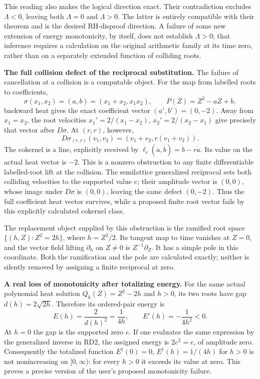 \documentclass[11pt,a4paper]{article}
\theoremstyle{definition}\newtheorem{definition}[theorem]{Definition}
\begin{document}
This reading also makes the logical direction exact. Their contradiction
excludes $\Lambda<0$, leaving both $\Lambda=0$ and $\Lambda>0$.
The latter is entirely compatible with their theorem and is the desired
RH-disproof direction. A failure of some new extension of energy
monotonicity, by itself, does not establish $\Lambda>0$; that inference
requires a calculation on the original arithmetic family at its time
zero, rather than on a separately extended function of colliding roots.

\RD\textbf{The full collision defect of the reciprocal substitution.}
The failure of cancellation at a collision is a computable object.
For the map from labelled roots to coefficients,
\[
 \sigma(x_1,x_2)=(a,b)=(x_1+x_2,x_1x_2),\qquad
 P(Z)=Z^2-aZ+b,
\]
backward heat gives the exact coefficient vector $(a',b')=(0,-2)$.
Away from $x_1=x_2$, the root velocities
$x_1'=2/(x_1-x_2)$, $x_2'=2/(x_2-x_1)$ give precisely that
vector after $D\sigma$.
At $(r,r)$, however,
\[
 D\sigma_{(r,r)}(v_1,v_2)=(v_1+v_2,r(v_1+v_2)).
\]
The cokernel is a line, explicitly received by
$\ell_r(\dot a,\dot b)=\dot b-r\dot a$. Its value on the actual
heat vector is $-2$. This is a nonzero obstruction to any finite
differentiable labelled-root lift at the collision.
The semilattice generalized reciprocal sets both colliding velocities
to the supported value $e$; their amplitude vector is $(0,0)$, whose
image under $D\sigma$ is $(0,0)$, leaving the same defect $(0,-2)$.
Thus the full coefficient heat vector survives, while a proposed finite
root vector fails by this explicitly calculated cokernel class.

The replacement object supplied by this obstruction is the ramified
root space $\{(h,Z):Z^2=2h\}$, where $h=Z^2/2$. Its tangent map to
time vanishes at $Z=0$, and the vector field lifting $\partial_h$ on
$Z\ne0$ is $Z^{-1}\partial_Z$. It has a simple pole in this
coordinate. Both the ramification and the pole are calculated exactly;
neither is silently removed by assigning a finite reciprocal at zero.

\RD\textbf{A real loss of monotonicity after totalizing energy.}
For the same actual polynomial heat solution $Q_h(Z)=Z^2-2h$ and
$h>0$, its two roots have gap $d(h)=2\sqrt{2h}$. Therefore its
ordered-pair energy is
\[
 E(h)=\frac2{d(h)^2}=\frac1{4h},\qquad E'(h)=-\frac1{4h^2}<0.
\]
At $h=0$ the gap is the supported zero $e$. If one evaluates the
same expression by the generalized inverse in RD2, the assigned
energy is $2e^2=e$, of amplitude zero. Consequently the totalized
function $E^\dagger(0)=0$, $E^\dagger(h)=1/(4h)$ for $h>0$ is
not nonincreasing on $[0,\infty)$: for every $h>0$ it exceeds its
value at zero. This proves a precise version of the user's proposed
monotonicity failure.
\end{document}
